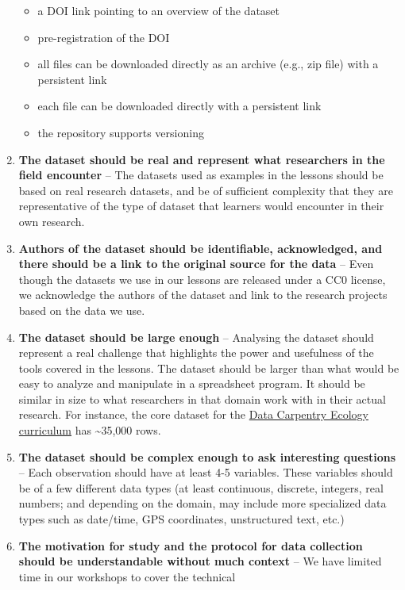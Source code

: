 \documentclass[
]{book}
\providecommand{\tightlist}{%
  \setlength{\itemsep}{0pt}\setlength{\parskip}{0pt}}
\begin{document}
\begin{enumerate}
  \begin{itemize}
  \tightlist
  \item
    a DOI link pointing to an overview of the dataset
  \item
    pre-registration of the DOI
  \item
    all files can be downloaded directly as an archive (e.g., zip file) with a persistent link
  \item
    each file can be downloaded directly with a persistent link
  \item
    the repository supports versioning
  \end{itemize}
\item
  \textbf{The dataset should be real and represent what researchers in the field encounter} --
  The datasets used as examples in the
  lessons should be based on real research datasets, and be of sufficient complexity that they
  are representative of the type of dataset that learners would encounter in their own
  research.
\item
  \textbf{Authors of the dataset should be identifiable, acknowledged, and there should be a link to the original source for the data} -- Even though the datasets we use in our lessons are
  released under a CC0 license, we acknowledge the authors of the dataset and link to
  the research projects based on the data we use.
\item
  \textbf{The dataset should be large enough} -- Analysing the dataset should represent a real
  challenge that
  highlights the power and usefulness of the tools covered in the lessons. The dataset should
  be larger than what would be easy to analyze and manipulate in a spreadsheet program. It
  should be similar in size to what researchers in that domain work with in their actual
  research. For instance, the core dataset for the \href{https://datacarpentry.org/ecology-workshop/data/}{Data Carpentry Ecology curriculum} has \textasciitilde35,000 rows.
\item
  \textbf{The dataset should be complex enough to ask interesting questions} -- Each observation
  should have at least 4-5 variables. These variables should be of a few
  different data types (at least continuous, discrete, integers, real numbers; and depending
  on the domain, may include more specialized data types such as date/time, GPS coordinates, unstructured text, etc.)
\item
  \textbf{The motivation for study and the protocol for data collection should be understandable without much context} -- We have limited time in our workshops to cover the technical

\end{enumerate}
\end{document}
